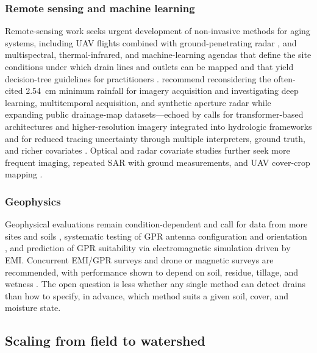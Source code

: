 \documentclass[11pt]{article}
\begin{document}
\subsubsection{Remote sensing and machine learning}

Remote-sensing work seeks urgent development of non-invasive methods for aging
systems, including UAV flights combined with ground-penetrating radar
\parencite{Wienken2024}, and multispectral, thermal-infrared, and
machine-learning agendas that define the site conditions under which drain
lines and outlets can be mapped and that yield decision-tree guidelines for
practitioners \parencite{Allred2020,Allred2021,Allred2022}. \textcite{Carlsen2024}
recommend reconsidering the often-cited 2.54~cm minimum rainfall for imagery
acquisition and investigating deep learning, multitemporal acquisition, and
synthetic aperture radar while expanding public drainage-map datasets---echoed
by calls for transformer-based architectures and higher-resolution imagery
integrated into hydrologic frameworks \parencite{Wan2024} and for reduced
tracing uncertainty through multiple interpreters, ground truth, and richer
covariates \parencite{Redoloza2023,Harris2018,Yimer2023}. Optical and radar
covariate studies further seek more frequent imaging, repeated SAR with ground
measurements, and UAV cover-crop mapping
\parencite{Tlapáková2017,Meunier2001,Xu2018}.

\subsubsection{Geophysics}

Geophysical evaluations remain condition-dependent and call for data from more
sites and soils \parencite{Allred2005}, systematic testing of GPR antenna
configuration and orientation \parencite{Allred2013}, and prediction of GPR
suitability via electromagnetic simulation driven by EMI. Concurrent EMI/GPR
surveys and drone or magnetic surveys are recommended, with performance shown to
depend on soil, residue, tillage, and wetness
\parencite{Koganti2020,Koganti2021,Jouen2018,Kratt2020,Allred2018b}. The
open question is less whether any single method can detect drains than how to
specify, in advance, which method suits a given soil, cover, and moisture
state.

\subsection{Scaling from field to watershed}
\end{document}
